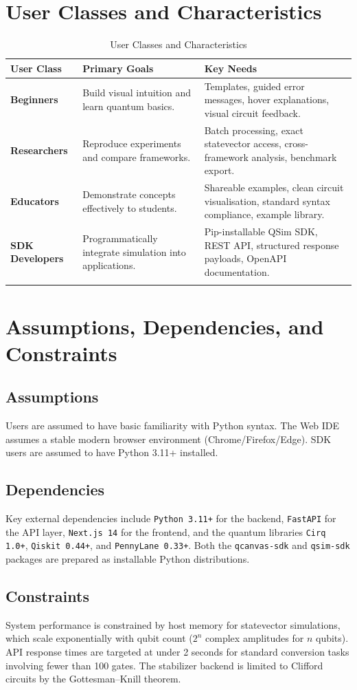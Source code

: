 \section{User Classes and Characteristics}

\begin{longtable}{p{} p{} p{}}
\toprule
\textbf{User Class} & \textbf{Primary Goals} & \textbf{Key Needs} \\
\midrule
\endhead
\textbf{Beginners} & Build visual intuition and learn quantum basics. & Templates, guided error messages, hover explanations, visual circuit feedback. \\
\addlinespace
\textbf{Researchers} & Reproduce experiments and compare frameworks. & Batch processing, exact statevector access, cross-framework analysis, benchmark export. \\
\addlinespace
\textbf{Educators} & Demonstrate concepts effectively to students. & Shareable examples, clean circuit visualisation, standard syntax compliance, example library. \\
\addlinespace
\textbf{SDK Developers} & Programmatically integrate simulation into applications. & Pip-installable QSim SDK, REST API, structured response payloads, OpenAPI documentation. \\
\bottomrule
\caption{User Classes and Characteristics}
\label{tab:user-classes}
\end{longtable}

\section{Assumptions, Dependencies, and Constraints}

\subsection{Assumptions}
Users are assumed to have basic familiarity with Python syntax. The Web IDE assumes a stable modern browser environment (Chrome/Firefox/Edge). SDK users are assumed to have Python 3.11+ installed.

\subsection{Dependencies}
Key external dependencies include \texttt{Python 3.11+} for the backend, \texttt{FastAPI} for the API layer, \texttt{Next.js 14} for the frontend, and the quantum libraries \texttt{Cirq 1.0+}, \texttt{Qiskit 0.44+}, and \texttt{PennyLane 0.33+}. Both the \texttt{qcanvas-sdk} and \texttt{qsim-sdk} packages are prepared as installable Python distributions.

\subsection{Constraints}
System performance is constrained by host memory for statevector simulations, which scale exponentially with qubit count ($2^n$ complex amplitudes for $n$ qubits). API response times are targeted at under 2 seconds for standard conversion tasks involving fewer than 100 gates. The stabilizer backend is limited to Clifford circuits by the Gottesman--Knill theorem.
